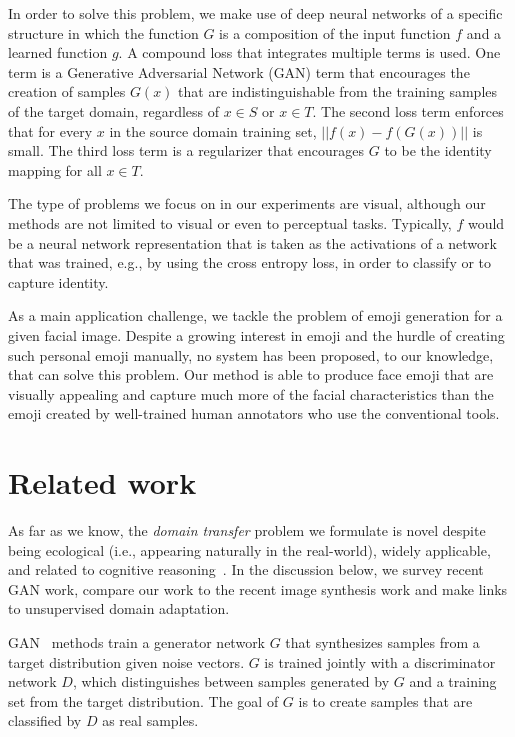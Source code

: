 \documentclass{article} %
\begin{document}
In order to solve this problem, we make use of deep neural networks of a specific structure in which the function $G$ is a composition of the input function $f$ and a learned function $g$. A compound loss that integrates multiple terms is used. One term is a Generative Adversarial Network (GAN) term that encourages the creation of samples $G(x)$ that are indistinguishable from the training samples of the target domain, regardless of $x\in S$ or $x\in T$. The second loss term enforces that for every $x$ in the source domain training set, $||f(x) - f(G(x))||$ is small. The third loss term is a regularizer that encourages $G$ to be the identity mapping for all $x \in T$.

The type of problems we focus on in our experiments are visual, although our methods are not limited to visual or even to perceptual tasks. Typically, $f$ would be a neural network representation that is taken as the activations of a network that was trained, e.g., by using the cross entropy loss, in order to classify or to capture identity.

As a main application challenge, we tackle the problem of emoji generation for a given facial image. Despite a growing interest in emoji and the hurdle of creating such personal emoji manually, no system has been proposed, to our knowledge, that can solve this problem. Our method is able to produce face emoji that are visually appealing and capture much more of the facial characteristics than the emoji created by well-trained human annotators who use the conventional tools.

\section{Related work}
\label{sec:relatedwork}
As far as we know, the {\it domain transfer} problem we formulate is novel despite being ecological (i.e., appearing naturally in the real-world), widely applicable, and related to cognitive reasoning~\citep{thewaywethink}. In the discussion below, we survey recent GAN work, compare our work to the recent image synthesis work and make links to unsupervised domain adaptation.

GAN~\citep{gan} methods train a generator network $G$ that synthesizes samples from a 
target distribution given noise vectors. $G$ is trained jointly with a discriminator network $D$, which distinguishes between samples generated by $G$ and a training set from the target distribution. The goal of $G$ is to create samples that are classified by $D$ as real samples.
\end{document}
